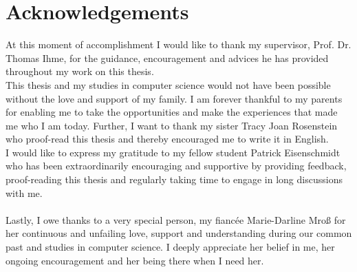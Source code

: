 \chapter*{Acknowledgements}
At this moment of accomplishment I would like to thank my supervisor, Prof. Dr. Thomas Ihme, for the guidance, encouragement and advices he has provided throughout my work on this thesis.\\
This thesis and my studies in computer science would not have been possible without the love and support of my family. I am forever thankful to my parents for enabling me to take the opportunities and make the experiences that made me who I am today. Further, I want to thank my sister Tracy Joan Rosenstein who proof-read this thesis and thereby encouraged me to write it in English.\\
I would like to express my gratitude to my fellow student Patrick Eisenschmidt who has been extraordinarily encouraging and supportive by providing feedback, proof-reading this thesis and regularly taking time to engage in long discussions with me.\\ \\
Lastly, I owe thanks to a very special person, my fiancée Marie-Darline Mroß for her continuous and unfailing love, support and understanding during our common past and studies in computer science. I deeply appreciate her belief in me, her ongoing encouragement and her being there when I need her.